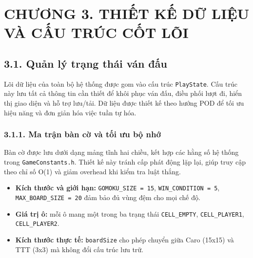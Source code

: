\newpage
\chapter*{\centering CHƯƠNG 3. THIẾT KẾ DỮ LIỆU VÀ CẤU TRÚC CỐT LÕI}

\section*{3.1. Quản lý trạng thái ván đấu}

\noindent \indent Lõi dữ liệu của toàn bộ hệ thống được gom vào cấu trúc \texttt{PlayState}. Cấu trúc này lưu tất cả thông tin cần thiết để khôi phục ván đấu, điều phối lượt đi, hiển thị giao diện và hỗ trợ lưu/tải. Dữ liệu được thiết kế theo hướng POD để tối ưu hiệu năng và đơn giản hóa việc tuần tự hóa.

\subsection*{3.1.1. Ma trận bàn cờ và tối ưu bộ nhớ}

\noindent \indent Bàn cờ được lưu dưới dạng mảng tĩnh hai chiều, kết hợp các hằng số hệ thống trong \texttt{GameConstants.h}. Thiết kế này tránh cấp phát động lặp lại, giúp truy cập theo chỉ số O(1) và giảm overhead khi kiểm tra luật thắng.

\begin{itemize}
  \item \textbf{Kích thước và giới hạn:} \texttt{GOMOKU\_SIZE = 15}, \texttt{WIN\_CONDITION = 5}, \\ \texttt{MAX\_BOARD\_SIZE = 20} đảm bảo đủ vùng đệm cho mọi chế độ.
  \item \textbf{Giá trị ô:} mỗi ô mang một trong ba trạng thái \texttt{CELL\_EMPTY}, \texttt{CELL\_PLAYER1}, \texttt{CELL\_PLAYER2}.
  \item \textbf{Kích thước thực tế:} \texttt{boardSize} cho phép chuyển giữa Caro (15x15) và TTT (3x3) mà không đổi cấu trúc lưu trữ.
\end{itemize}


